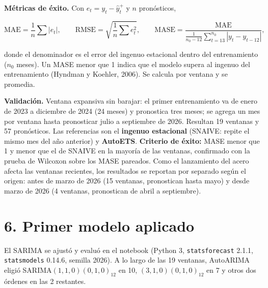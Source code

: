\documentclass[
  spanish,
  11pt,
]{article}
\begin{document}
\textbf{Métricas de éxito.} Con \(e_t = y_t - \hat y^{+}_t\) y \(n\)
pronósticos,

\[\text{MAE} = \frac{1}{n}\sum |e_t|, \qquad \text{RMSE} = \sqrt{\frac{1}{n}\sum e_t^2}, \qquad \text{MASE} = \frac{\text{MAE}}{\frac{1}{n_0 - 12}\sum_{t=13}^{n_0} |y_t - y_{t-12}|},\]

donde el denominador es el error del ingenuo estacional dentro del
entrenamiento (\(n_0\) meses). Un MASE menor que 1 indica que el modelo
supera al ingenuo del entrenamiento (Hyndman y Koehler, 2006). Se
calcula por ventana y se promedia.

\textbf{Validación.} Ventana expansiva sin barajar: el primer
entrenamiento va de enero de 2023 a diciembre de 2024 (24 meses) y
pronostica tres meses; se agrega un mes por ventana hasta pronosticar
julio a septiembre de 2026. Resultan 19 ventanas y 57 pronósticos. Las
referencias son el \textbf{ingenuo estacional} (SNAIVE: repite el mismo
mes del año anterior) y \textbf{AutoETS}. \textbf{Criterio de éxito:}
MASE menor que 1 y menor que el de SNAIVE en la mayoría de las ventanas,
confirmado con la prueba de Wilcoxon sobre los MASE pareados. Como el
lanzamiento del acero afecta las ventanas recientes, los resultados se
reportan por separado según el origen: antes de marzo de 2026 (15
ventanas, pronostican hasta mayo) y desde marzo de 2026 (4 ventanas,
pronostican de abril a septiembre).

\section{6. Primer modelo aplicado}\label{primer-modelo-aplicado}

El SARIMA se ajustó y evaluó en el notebook (Python 3,
\texttt{statsforecast} 2.1.1, \texttt{statsmodels} 0.14.6, semilla
2026). A lo largo de las 19 ventanas, AutoARIMA eligió
SARIMA\((1,1,0)(0,1,0)_{12}\) en 10, \((3,1,0)(0,1,0)_{12}\) en 7 y
otros dos órdenes en las 2 restantes.
\end{document}
